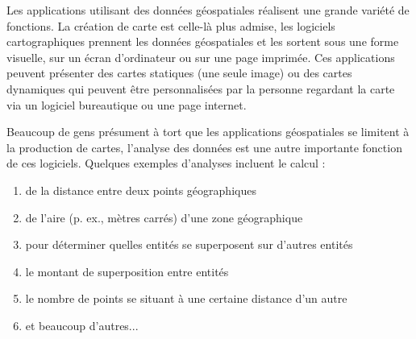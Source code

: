 Les applications utilisant des données géospatiales réalisent une grande variété de fonctions. La création de carte est celle-là plus admise, les logiciels cartographiques prennent les données géospatiales et les sortent sous une forme visuelle, sur un écran d'ordinateur ou sur une page imprimée.
Ces applications peuvent présenter des cartes statiques (une seule image) ou des cartes dynamiques qui peuvent être personnalisées par la personne regardant la carte via un logiciel bureautique ou une page internet.

Beaucoup de gens présument à tort que les applications géospatiales se limitent à la production de cartes, l'analyse des données est une autre importante fonction de ces logiciels. Quelques exemples d'analyses incluent le calcul : 


\begin{enumerate} 
\item de la distance entre deux points géographiques  
\item de l'aire (p. ex., mètres carrés) d'une zone géographique 
\item pour déterminer quelles entités se superposent sur d'autres entités 
\item le montant de superposition entre entités 
\item le nombre de points se situant à une certaine distance d'un autre 
\item et beaucoup d'autres...
\end{enumerate} 

%

